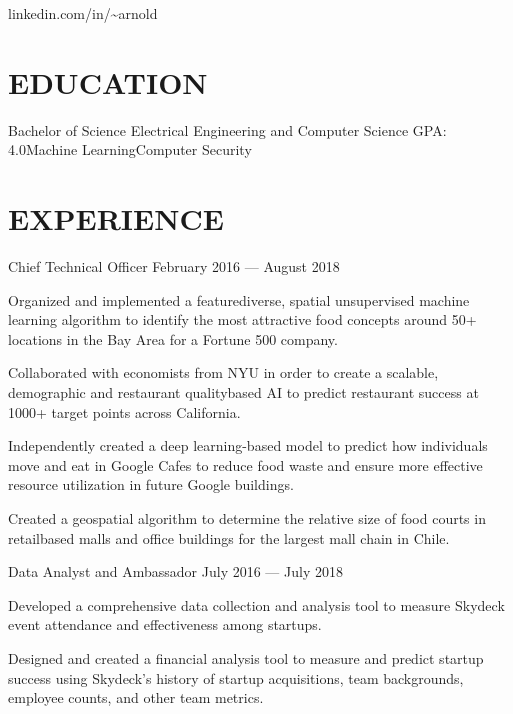 \documentclass[10pt]{article}
\begin{document}
				 {linkedin.com/in/{\textasciitilde}arnold}      

\section*{EDUCATION}

    {Bachelor of Science {\textendash} Electrical Engineering and Computer Science}
{GPA: 4.0}{Machine Learning}{Computer Security}


\section*{EXPERIENCE}

								{Chief Technical Officer}
								{February 2016 --- August 2018}                  		
	                   \begin{accomplishments} 
	                    		\item Organized and implemented a feature{\textendash}diverse, spatial unsupervised machine learning algorithm to identify the most attractive food concepts around 50+ locations in the Bay Area for a Fortune 500 company.
	                    		\item Collaborated with economists from NYU in order to create a scalable, demographic and restaurant quality{\textendash}based AI to predict restaurant success at 1000+ target points across California.
	                    		\item Independently created a deep learning-based model to predict how individuals move and eat in Google Cafes to reduce food waste and ensure more effective resource utilization in future Google buildings.
	                    		\item Created a geospatial algorithm to determine the relative size of food courts in retail{\textendash}based malls and office buildings for the largest mall chain in Chile.
	                    \end{accomplishments}
	                    		
	   		
	   		\employer{Skydeck Berkeley}{Berkeley, CA}
	   			{Data Analyst and Ambassador}
	   			{July 2016 --- July 2018}
			  		\begin{accomplishments}
	                   		\item Developed a comprehensive data collection and analysis tool to measure Skydeck event attendance and effectiveness among startups.
	                   		\item Designed and created a financial analysis tool to measure and predict startup success using Skydeck's history of startup acquisitions, team backgrounds, employee counts, and other team metrics.
	                  \end{accomplishments}
                  	 
\end{document}
